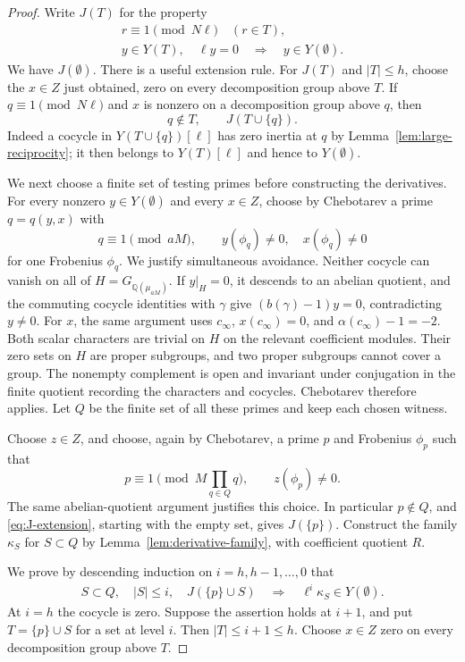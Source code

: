 \documentclass[11pt,a4paper]{article}
\theoremstyle{definition}
\newcommand{\Q}{\mathbb Q}
\begin{document}
\begin{proof}
Write \(J(T)\) for the property
\[
 \begin{gathered}
 r\equiv1\pmod{N\ell}\quad(r\in T),\\
 y\in Y(T),\quad \ell y=0\quad\Longrightarrow\quad y\in Y(\emptyset).
 \end{gathered}
\]
We have \(J(\emptyset)\).
There is a useful extension rule.
For \(J(T)\) and \(|T|\le h\), choose the \(x\in Z\)
just obtained, zero on every decomposition group above \(T\).
If \(q\equiv1\pmod{N\ell}\) and \(x\) is nonzero on a decomposition
group above \(q\), then
\begin{equation}\label{eq:J-extension}
 q\notin T,\qquad J(T\cup\{q\}).
\end{equation}
Indeed a cocycle in \(Y(T\cup\{q\})[\ell]\) has zero inertia
at \(q\) by Lemma~\ref{lem:large-reciprocity};
it then belongs to \(Y(T)[\ell]\) and hence to \(Y(\emptyset)\).

We next choose a finite set of testing primes before constructing
the derivatives.
For every nonzero \(y\in Y(\emptyset)\) and every \(x\in Z\),
choose by Chebotarev a prime \(q=q(y,x)\) with
\[
 q\equiv1\pmod{aM},\qquad
 y(\phi_q)\ne0,\quad x(\phi_q)\ne0
\]
for one Frobenius \(\phi_q\).
We justify simultaneous avoidance.
Neither cocycle can vanish on all of
\(H=G_{\Q(\mu_{aM})}\).
If \(y|_H=0\), it descends to an abelian quotient,
and the commuting cocycle identities with \(\gamma\) give
\((b(\gamma)-1)y=0\), contradicting \(y\ne0\).
For \(x\), the same argument uses \(c_\infty\),
\(x(c_\infty)=0\), and \(\alpha(c_\infty)-1=-2\).
Both scalar characters are trivial on \(H\) on the relevant
coefficient modules.
Their zero sets on \(H\) are proper subgroups,
and two proper subgroups cannot cover a group.
The nonempty complement is open and invariant under conjugation
in the finite quotient recording the characters and cocycles.
Chebotarev therefore applies.
Let \(Q\) be the finite set of all these primes and keep each chosen witness.

Choose \(z\in Z\), and choose, again by Chebotarev,
a prime \(p\) and Frobenius \(\phi_p\) such that
\[
 p\equiv1\pmod{M\prod_{q\in Q}q},
                   \qquad z(\phi_p)\ne0.
\]
The same abelian-quotient argument justifies this choice.
In particular \(p\notin Q\), and
\eqref{eq:J-extension}, starting with the empty set, gives \(J(\{p\})\).
Construct the family \(\kappa_S\) for \(S\subset Q\)
by Lemma~\ref{lem:derivative-family}, with coefficient quotient \(R\).

We prove by descending induction on \(i=h,h-1,\ldots,0\) that
\begin{equation}\label{eq:descending-kappa}
 \begin{split}
 S\subset Q,\quad |S|\le i,\quad J(\{p\}\cup S)
 \quad\Longrightarrow\quad
                   \ell^i\kappa_S\in Y(\emptyset).
 \end{split}
\end{equation}
At \(i=h\) the cocycle is zero.
Suppose the assertion holds at \(i+1\), and put \(T=\{p\}\cup S\)
for a set at level \(i\).
Then \(|T|\le i+1\le h\).
Choose \(x\in Z\) zero on every decomposition group above \(T\).


\end{proof}
\end{document}
